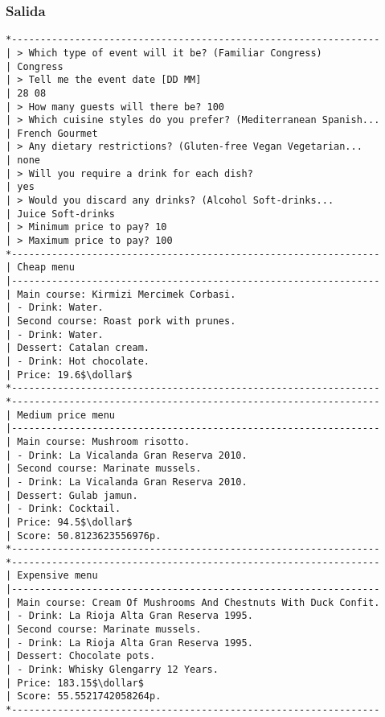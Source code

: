\documentclass{article}
\newcommand{\dollar}{\mbox{\textdollar}}
\begin{document}
\subsubsection{Salida}
\begin{lstlisting}
*----------------------------------------------------------------
| > Which type of event will it be? (Familiar Congress)
| Congress
| > Tell me the event date [DD MM]
| 28 08
| > How many guests will there be? 100
| > Which cuisine styles do you prefer? (Mediterranean Spanish...
| French Gourmet
| > Any dietary restrictions? (Gluten-free Vegan Vegetarian...
| none
| > Will you require a drink for each dish?
| yes
| > Would you discard any drinks? (Alcohol Soft-drinks...
| Juice Soft-drinks
| > Minimum price to pay? 10
| > Maximum price to pay? 100
*----------------------------------------------------------------
| Cheap menu
|----------------------------------------------------------------
| Main course: Kirmizi Mercimek Corbasi.
| - Drink: Water.
| Second course: Roast pork with prunes.
| - Drink: Water.
| Dessert: Catalan cream.
| - Drink: Hot chocolate.
| Price: 19.6$\dollar$
*----------------------------------------------------------------
*----------------------------------------------------------------
| Medium price menu
|----------------------------------------------------------------
| Main course: Mushroom risotto.
| - Drink: La Vicalanda Gran Reserva 2010.
| Second course: Marinate mussels.
| - Drink: La Vicalanda Gran Reserva 2010.
| Dessert: Gulab jamun.
| - Drink: Cocktail.
| Price: 94.5$\dollar$
| Score: 50.8123623556976p.
*----------------------------------------------------------------
*----------------------------------------------------------------
| Expensive menu
|----------------------------------------------------------------
| Main course: Cream Of Mushrooms And Chestnuts With Duck Confit.
| - Drink: La Rioja Alta Gran Reserva 1995.
| Second course: Marinate mussels.
| - Drink: La Rioja Alta Gran Reserva 1995.
| Dessert: Chocolate pots.
| - Drink: Whisky Glengarry 12 Years.
| Price: 183.15$\dollar$
| Score: 55.5521742058264p.
*----------------------------------------------------------------
\end{lstlisting}
\end{document}
